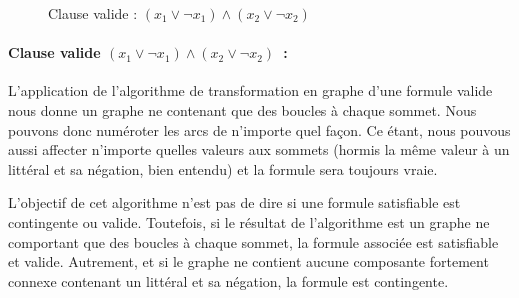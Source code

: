 \documentclass{article}
\begin{document}
\begin{figure}[h!]
  \centering
  \caption{Clause valide :  $(x_{1} \vee \neg x_{1}) \wedge (x_{2} \vee \neg x_{2})$}
  \label{fig:clause-valide}
\end{figure}


\paragraph*{Clause valide $(x_{1} \vee \neg x_{1}) \wedge (x_{2} \vee \neg x_{2})$~:}
L'application de l'algorithme de transformation en graphe d'une formule valide nous donne un graphe ne contenant que des boucles à chaque sommet. Nous pouvons donc numéroter les arcs de n'importe quel façon. Ce étant, nous pouvous aussi affecter n'importe quelles valeurs aux sommets (hormis la même valeur à un littéral et sa négation, bien entendu) et la formule sera toujours vraie. 

L'objectif de cet algorithme n'est pas de dire si une formule satisfiable est contingente ou valide. Toutefois, si le résultat de l'algorithme est un graphe ne comportant que des boucles à chaque sommet, la formule associée est satisfiable et valide. Autrement, et si le graphe ne contient aucune composante fortement connexe contenant un littéral et sa négation, la formule est contingente.
\end{document}
